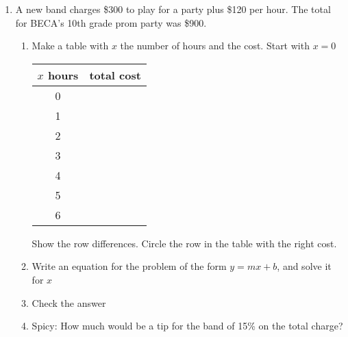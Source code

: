 \documentclass[12pt, oneside]{article}
\begin{document}
\begin{enumerate}
\newpage


  \item A new band charges \$300 to play for a party plus \$120 per hour. The total for BECA's 10th grade prom party was \$900.
  \begin{enumerate}
    \item Make a table with $x$ the number of hours and the cost. Start with $x=0$ \\[0.5cm]
    \renewcommand{\arraystretch}{1.6}
    \begin{center}
      \begin{tabular}{|c|r|}
      \hline
      $x$ hours & total cost\\
      \hline
      0 &  \\
      \hline
      1 &  \\
      \hline
      2 &  \\
      \hline
      3 &  \\
      \hline
      4 &  \\
      \hline
      5 &  \\
      \hline
      6 &  \\
      \hline
      \end{tabular}
    \end{center}
    Show the row differences. Circle the row in the table with the right cost.
    \vspace{1cm}
    
    \item Write an equation for the problem of the form $y=mx+b$, and solve it for $x$ \vspace{3.5cm}
    \item Check the answer \vspace{2.5cm}
    \item Spicy: How much would be a tip for the band of 15\% on the total charge?
  \end{enumerate}


\end{enumerate}
\end{document}
